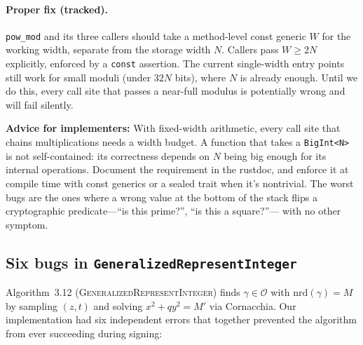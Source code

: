 \paragraph{Proper fix (tracked).}
\texttt{pow\_mod} and its three callers should take a method-level
const generic $W$ for the working width, separate from the storage
width $N$.  Callers pass $W \geq 2N$ explicitly, enforced by a
\texttt{const} assertion.  The current single-width entry points
still work for small moduli (under $32N$ bits), where $N$ is already
enough.  Until we do this, every call site that passes a near-full
modulus is potentially wrong and will fail silently.

\noindent
\textbf{Advice for implementers:} With fixed-width arithmetic, every call site that
chains multiplications needs a width budget.  A function that takes a
\texttt{BigInt<N>} is not self-contained: its correctness depends on
$N$ being big enough for its internal operations.  Document the
requirement in the rustdoc, and enforce it at compile time with const
generics or a sealed trait when it's nontrivial.  The worst bugs are
the ones where a wrong value at the bottom of the stack flips a
cryptographic predicate---``is this prime?'', ``is this a square?''---
with no other symptom.

\subsection{Six bugs in \texttt{GeneralizedRepresentInteger}}
\label{sec:bug-represent-integer}

Algorithm~3.12 (\textsc{GeneralizedRepresentInteger}) finds
$\gamma \in \mathcal{O}$ with $\mathrm{nrd}(\gamma) = M$ by sampling
$(z, t)$ and solving $x^2 + qy^2 = M'$ via Cornacchia.  Our
implementation had six independent errors that together prevented
the algorithm from ever succeeding during signing:

